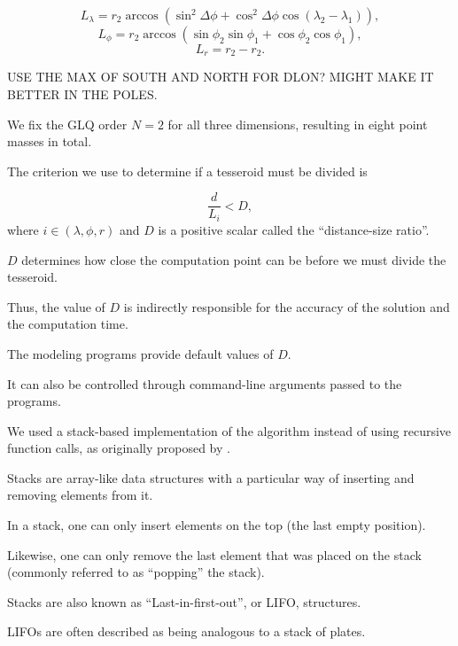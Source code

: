 \documentclass[paper,twocolumn]{geophysics}
\begin{document}
\begin{equation}
    L_\lambda = r_2 \arccos(\sin^2\Delta\phi +
        \cos^2\Delta\phi\cos(\lambda_2 - \lambda_1)),
    \label{eq:sizelon}
\end{equation}
\begin{equation}
    L_\phi = r_2 \arccos(\sin\phi_2\sin\phi_1 + \cos\phi_2\cos\phi_1),
\end{equation}
\begin{equation}
    L_r = r_2 - r_2.
    \label{eq:sizer}
\end{equation}


USE THE MAX OF SOUTH AND NORTH FOR DLON? MIGHT MAKE IT BETTER IN THE POLES.

We fix the GLQ order $N=2$ for all three dimensions, resulting in eight point
masses in total.

The criterion we use to determine if a tesseroid must be divided is

\begin{equation}
    \frac{d}{L_i} < D,
    \label{eq:condition}
\end{equation}
\noindent
where $i \in (\lambda, \phi, r)$
and $D$ is a positive scalar called the ``distance-size ratio''.

$D$ determines how close the
computation point can be before we must divide the tesseroid.

Thus, the value of $D$ is indirectly responsible for
the accuracy of the solution and the computation time.

The modeling programs provide default values of $D$.

It can also be controlled through command-line arguments passed to the
programs.



We used a stack-based implementation of the algorithm instead of using
recursive function calls, as originally proposed by \citet{Li2011}.

Stacks are array-like data structures with a particular way of inserting and
removing elements from it.

In a stack, one can only insert elements on the top (the last empty position).

Likewise,
one can only remove the last element that was placed on the stack
(commonly referred to as ``popping'' the stack).

Stacks are also known as ``Last-in-first-out'', or LIFO, structures.

LIFOs are often described as being analogous to a stack of plates.
\end{document}
